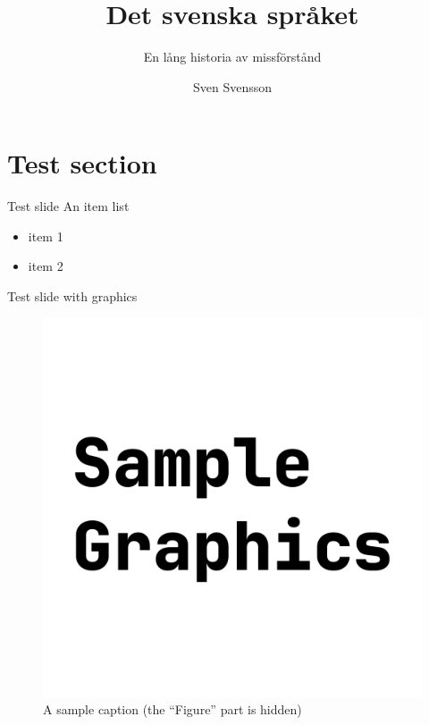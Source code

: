 \documentclass[aspectratio=169]{beamer}
\title{Det svenska språket}
\subtitle{En lång historia av missförstånd}
\author{Sven Svensson}
\institute{Institutionen för svenska, flerspråkighet och språkteknologi\\Göteborgs Universitet}
\begin{document}
\begin{frame}
  \maketitle
\end{frame}

\section{Test section}

\begin{frame}{Test slide}
  An item list
  \begin{itemize}
  \item item 1
  \item item 2
  \end{itemize}
\end{frame}

\begin{frame}[fragile]{Test slide with graphics}
  \begin{figure}
    \includegraphics[height=0.6\textheight]{sample-graphics.pdf}
    \caption{A sample caption (the ``Figure'' part is hidden)}
  \end{figure}
\end{frame}

\begin{frame}
  \makefinal
\end{frame}
  
\end{document}

